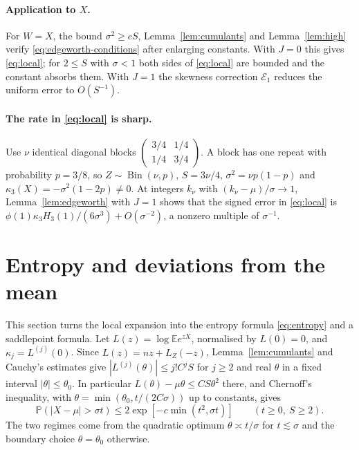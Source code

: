 \documentclass[11pt,a4paper]{article}
\theoremstyle{definition}\newtheorem{remark}[theorem]{Remark}\newtheorem{conjecture}{Conjecture}
\newcommand{\E}{\mathbb E}\newcommand{\Prb}{\mathbb P}\newcommand{\Var}{\operatorname{Var}}
\begin{document}
\paragraph{Application to $X$.} For $W=X$, the bound $\sigma^2\ge cS$, Lemma~\ref{lem:cumulants} and Lemma~\ref{lem:high} verify \eqref{eq:edgeworth-conditions} after enlarging constants. With $J=0$ this gives \eqref{eq:local}; for $2\le S$ with $\sigma<1$ both sides of \eqref{eq:local} are bounded and the constant absorbs them. With $J=1$ the skewness correction $\mathcal E_1$ reduces the uniform error to $O(S^{-1})$.

\paragraph{The rate in \eqref{eq:local} is sharp.} Use $\nu$ identical diagonal blocks $\left(\begin{smallmatrix}3/4&1/4\\1/4&3/4\end{smallmatrix}\right)$. A block has one repeat with probability $p=3/8$, so $Z\sim\operatorname{Bin}(\nu,p)$, $S=3\nu/4$, $\sigma^2=\nu p(1-p)$ and $\kappa_3(X)=-\sigma^2(1-2p)\ne0$. At integers $k_\nu$ with $(k_\nu-\mu)/\sigma\to1$, Lemma~\ref{lem:edgeworth} with $J=1$ shows that the signed error in \eqref{eq:local} is $\phi(1)\kappa_3H_3(1)/(6\sigma^3)+O(\sigma^{-2})$, a nonzero multiple of $\sigma^{-1}$.

\section{Entropy and deviations from the mean}\label{sec:entropy}
This section turns the local expansion into the entropy formula \eqref{eq:entropy} and a saddlepoint formula. Let $L(z)=\log\E e^{zX}$, normalised by $L(0)=0$, and $\kappa_j=L^{(j)}(0)$. Since $L(z)=nz+L_Z(-z)$, Lemma~\ref{lem:cumulants} and Cauchy's estimates give $|L^{(j)}(\theta)|\le j!C^jS$ for $j\ge2$ and real $\theta$ in a fixed interval $|\theta|\le\theta_0$. In particular $L(\theta)-\mu\theta\le CS\theta^2$ there, and Chernoff's inequality, with $\theta=\min(\theta_0,t/(2C\sigma))$ up to constants, gives
\begin{equation}
 \Prb(|X-\mu|>\sigma t)\le 2\exp[-c\min(t^2,\sigma t)]\qquad(t\ge0,\ S\ge2).
 \label{eq:chern}
\end{equation}
The two regimes come from the quadratic optimum $\theta\asymp t/\sigma$ for $t\lesssim\sigma$ and the boundary choice $\theta=\theta_0$ otherwise.
\end{document}
